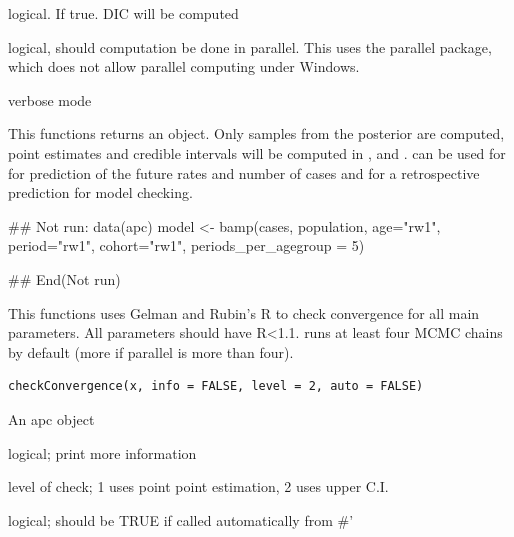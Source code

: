 \documentclass[a4paper]{book}
\begin{document}
\begin{Arguments}
\begin{ldescription}
\item[\code{dic}] logical. If true. DIC will be computed

\item[\code{parallel}] logical, should computation be done in parallel. This uses the parallel package, which does not allow parallel computing under Windows.

\item[\code{verbose}] verbose mode
\end{ldescription}
\end{Arguments}
%
\begin{Details}
This functions returns an  object. 
Only samples from the posterior are computed, point estimates and credible intervals will be computed in ,  and .
 can be used for for prediction of the future rates and number of cases and for a retrospective prediction for model checking.
\end{Details}
%
\begin{SeeAlso}
\end{SeeAlso}
%
\begin{Examples}
\begin{ExampleCode}
## Not run: 
data(apc)
model <- bamp(cases, population, age="rw1", period="rw1", cohort="rw1", periods_per_agegroup = 5)

## End(Not run)
\end{ExampleCode}
\end{Examples}
%
\begin{Description}
This functions uses Gelman and Rubin's R to check convergence for all main parameters. 
All parameters should have R<1.1. 
 runs at least four MCMC chains by default (more if parallel is more than four).
\end{Description}
%
\begin{Usage}
\begin{verbatim}
checkConvergence(x, info = FALSE, level = 2, auto = FALSE)
\end{verbatim}
\end{Usage}
%
\begin{Arguments}
\begin{ldescription}
\item[\code{x}] An apc object

\item[\code{info}] logical; print more information

\item[\code{level}] level of check; 1 uses point point estimation, 2 uses upper C.I.

\item[\code{auto}] logical; should be TRUE if called automatically from 
\#'
\end{ldescription}
\end{Arguments}
\end{document}
